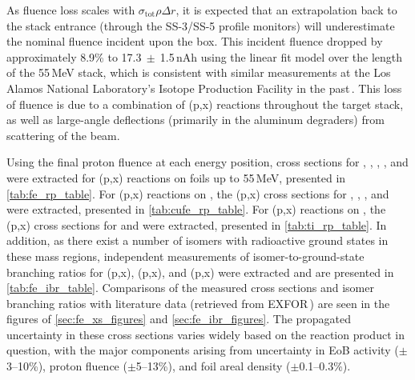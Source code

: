 As fluence loss scales with $\sigma_{\mathrm{tot}}\rho\Delta r$, it is expected that an extrapolation back to the stack entrance (through the SS-3/SS-5 profile monitors) will underestimate the nominal fluence incident upon the box.
This incident fluence dropped by approximately 
8.9\% to  17.3$~\pm~$1.5\,nAh using the linear fit model over the length of the 55\,MeV stack, which is consistent with similar measurements at the Los Alamos National Laboratory's Isotope Production Facility in the past\,\cite{Voyles2018a,Graves2016}.
This loss of fluence is due to a combination of 
(p,x) reactions throughout the target stack, as well as large-angle deflections (primarily in the aluminum degraders) from scattering of the beam.




Using the final proton fluence at each energy position, cross sections for , ,  ,   , and 
 were extracted for (p,x) reactions  on  foils up to 55\,MeV, presented in \autoref{tab:fe_rp_table}.
For  (p,x) reactions on , the (p,x) cross sections for  , , ,   and   were extracted, 
presented in \autoref{tab:cufe_rp_table}.
For  (p,x) reactions on , the (p,x) cross sections for   and   were extracted, 
presented in \autoref{tab:ti_rp_table}.
In addition, as there exist a number of isomers with radioactive ground states in these mass regions,  independent measurements of isomer-to-ground-state branching ratios for (p,x), (p,x), and (p,x) were  extracted and are presented in \autoref{tab:fe_ibr_table}.
Comparisons  of the measured cross sections and isomer branching ratios with literature data (retrieved from EXFOR\,\cite{Otuka2014272}) are seen in the figures of 
\ref{sec:fe_xs_figures} and \ref{sec:fe_ibr_figures}.
The propagated uncertainty in these cross sections varies widely based on the reaction product in question, with the major components  arising from uncertainty in EoB activity ($\pm$3--10\%), proton fluence ($\pm$5--13\%), and foil areal density ($\pm$0.1--0.3\%).









